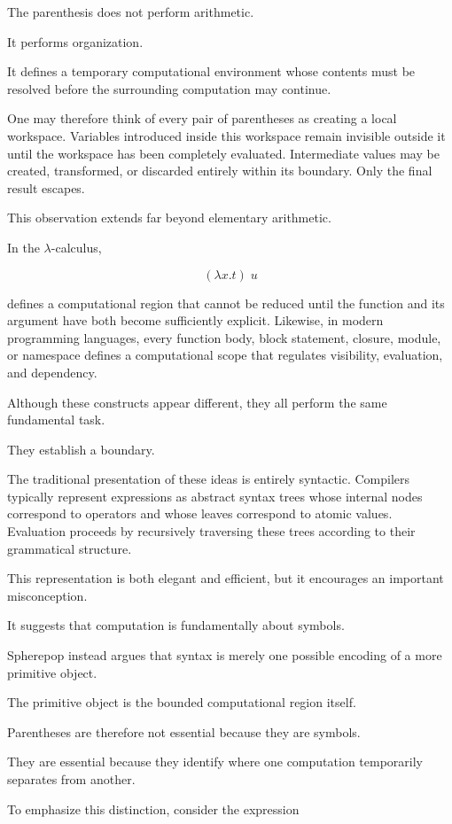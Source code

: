 \documentclass[12pt,oneside]{article}
\theoremstyle{definition}
\theoremstyle{remark}
\begin{document}
The parenthesis does not perform arithmetic.

It performs organization.

It defines a temporary computational environment whose contents must be
resolved before the surrounding computation may continue.

One may therefore think of every pair of parentheses as creating a local
workspace. Variables introduced inside this workspace remain invisible outside
it until the workspace has been completely evaluated. Intermediate values may
be created, transformed, or discarded entirely within its boundary. Only the
final result escapes.

This observation extends far beyond elementary arithmetic.

In the $\lambda$-calculus,

\[
(\lambda x.t)\;u
\]

defines a computational region that cannot be reduced until the function and
its argument have both become sufficiently explicit. Likewise, in modern
programming languages, every function body, block statement, closure, module,
or namespace defines a computational scope that regulates visibility,
evaluation, and dependency.

Although these constructs appear different, they all perform the same
fundamental task.

They establish a boundary.

The traditional presentation of these ideas is entirely syntactic.
Compilers typically represent expressions as abstract syntax trees whose
internal nodes correspond to operators and whose leaves correspond to atomic
values. Evaluation proceeds by recursively traversing these trees according to
their grammatical structure.

This representation is both elegant and efficient, but it encourages an
important misconception.

It suggests that computation is fundamentally about symbols.

Spherepop instead argues that syntax is merely one possible encoding of a more
primitive object.

The primitive object is the bounded computational region itself.

Parentheses are therefore not essential because they are symbols.

They are essential because they identify where one computation temporarily
separates from another.

To emphasize this distinction, consider the expression
\end{document}
